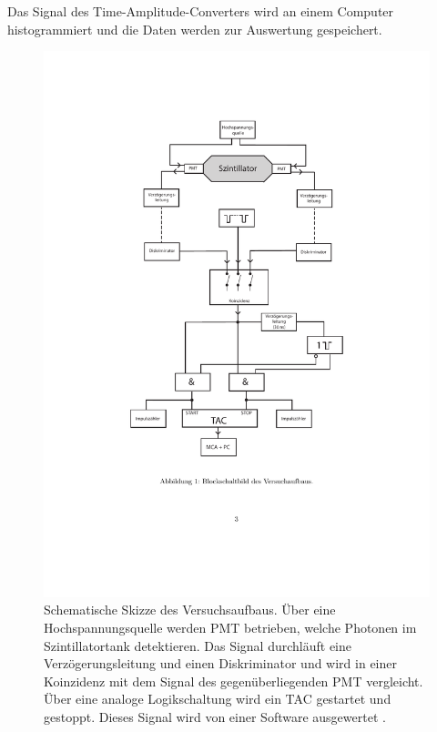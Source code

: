 Das Signal des Time-Amplitude-Converters wird an einem Computer histogrammiert und die Daten werden zur Auswertung gespeichert.

\begin{figure}
    \centering
    \includegraphics[width=.8\textwidth]{content/pics/Schaltbild.pdf}
    \caption{Schematische Skizze des Versuchsaufbaus. Über eine Hochspannungsquelle werden PMT betrieben, welche Photonen im Szintillatortank %
    detektieren. Das Signal durchläuft eine Verzögerungsleitung und einen Diskriminator und wird in einer Koinzidenz mit dem Signal des gegenüberliegenden PMT vergleicht. %
    Über eine analoge Logikschaltung wird ein TAC gestartet und gestoppt. Dieses Signal wird von einer Software ausgewertet \cite{V01}.}
    \label{fig:Aufbau}
  \end{figure}

